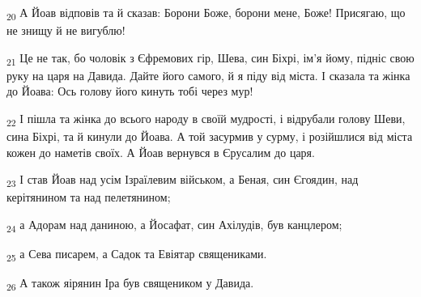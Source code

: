 \begin{tcolorbox}
\textsubscript{20} А Йоав відповів та й сказав: Борони Боже, борони мене, Боже! Присягаю, що не знищу й не вигублю!
\end{tcolorbox}
\begin{tcolorbox}
\textsubscript{21} Це не так, бо чоловік з Єфремових гір, Шева, син Біхрі, ім'я йому, підніс свою руку на царя на Давида. Дайте його самого, й я піду від міста. І сказала та жінка до Йоава: Ось голову його кинуть тобі через мур!
\end{tcolorbox}
\begin{tcolorbox}
\textsubscript{22} І пішла та жінка до всього народу в своїй мудрості, і відрубали голову Шеви, сина Біхрі, та й кинули до Йоава. А той засурмив у сурму, і розійшлися від міста кожен до наметів своїх. А Йоав вернувся в Єрусалим до царя.
\end{tcolorbox}
\begin{tcolorbox}
\textsubscript{23} І став Йоав над усім Ізраїлевим військом, а Беная, син Єгоядин, над керітянином та над пелетянином;
\end{tcolorbox}
\begin{tcolorbox}
\textsubscript{24} а Адорам над даниною, а Йосафат, син Ахілудів, був канцлером;
\end{tcolorbox}
\begin{tcolorbox}
\textsubscript{25} а Сева писарем, а Садок та Евіятар священиками.
\end{tcolorbox}
\begin{tcolorbox}
\textsubscript{26} А також яірянин Іра був священиком у Давида.
\end{tcolorbox}
